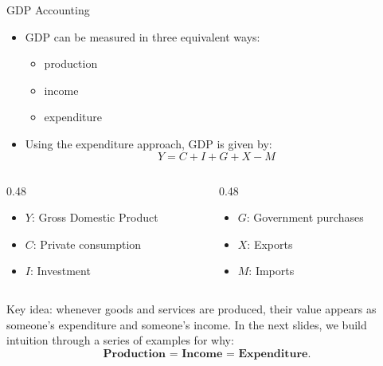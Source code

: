 \documentclass[10pt,aspectratio=169]{beamer}
\begin{document}
\begin{frame}{GDP Accounting}

\begin{itemize}
\item GDP can be measured in three equivalent ways:
\begin{itemize}
    \item production \hspace{1em} \item income \hspace{1em} \item expenditure
\end{itemize}

\medskip

\item Using the expenditure approach, GDP is given by:
\[
Y = C + I + G + X - M
\]
\end{itemize}
\vspace{-0.3cm}
\begin{columns}[T]
\begin{column}{0.48\textwidth}
\begin{itemize}
\item[-] \(Y\): Gross Domestic Product
\item[-] \(C\): Private consumption
\item[-] \(I\): Investment
\end{itemize}
\end{column}

\begin{column}{0.48\textwidth}
\begin{itemize}
\item[-] \(G\): Government purchases
\item[-] \(X\): Exports
\item[-] \(M\): Imports
\end{itemize}
\end{column}
\end{columns}

\medskip

\begin{itemize}
\itemvso Key idea: whenever goods and services are produced, their value appears
as someone's expenditure and someone's income.
\itemvso In the next slides, we build intuition through a series of examples for why:
\[
\textbf{Production = Income = Expenditure}.
\]
\end{itemize}

\end{frame}
\end{document}
